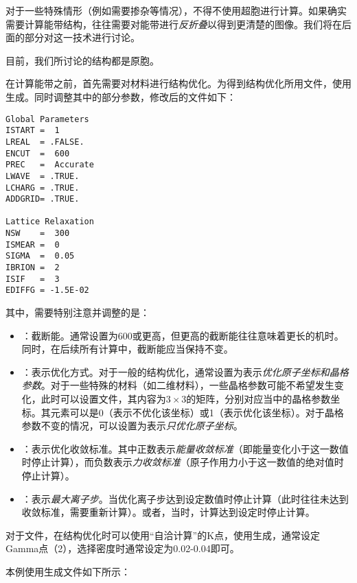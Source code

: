 \begin{extend}
    对于一些特殊情形（例如需要掺杂等情况），不得不使用超胞进行计算。如果确实需要计算能带结构，往往需要对能带进行\emph{反折叠}以得到更清楚的图像。我们将在后面的部分对这一技术进行讨论。

    目前，我们所讨论的结构都是原胞。
\end{extend}

在计算能带之前，首先需要对材料进行结构优化。为得到结构优化所用文件，使用生成。同时调整其中的部分参数，修改后的文件如下：

\begin{lstlisting}[caption=INCAR]
Global Parameters
ISTART =  1
LREAL  = .FALSE.
ENCUT  =  600
PREC   =  Accurate
LWAVE  = .TRUE.
LCHARG = .TRUE.
ADDGRID= .TRUE.
    
Lattice Relaxation
NSW    =  300
ISMEAR =  0
SIGMA  =  0.05
IBRION =  2
ISIF   =  3
EDIFFG = -1.5E-02
\end{lstlisting}

其中，需要特别注意并调整的是：

\begin{itemize}
    \item {}：截断能。通常设置为600或更高，但更高的截断能往往意味着更长的机时。同时，在后续所有计算中，截断能应当保持不变。
    \item {}：表示优化方式。对于一般的结构优化，通常设置为表示\emph{优化原子坐标和晶格参数}。对于一些特殊的材料（如二维材料），一些晶格参数可能不希望发生变化，此时可以设置文件，其内容为$3\times3$的矩阵，分别对应当中的晶格参数坐标。其元素可以是0（表示不优化该坐标）或1（表示优化该坐标）。对于晶格参数不变的情况，可以设置为表示\emph{只优化原子坐标}。
    \item {}：表示优化收敛标准。其中正数表示\emph{能量收敛标准}（即能量变化小于这一数值时停止计算），而负数表示\emph{力收敛标准}（原子作用力小于这一数值的绝对值时停止计算）。
    \item {}：表示\emph{最大离子步}。当优化离子步达到设定数值时停止计算（此时往往未达到收敛标准，需要重新计算）。或者，当时，计算达到设定时停止计算。
\end{itemize}

对于文件，在结构优化时可以使用“自洽计算”的K点，使用生成，通常设定Gamma点（2），选择密度时通常设定为0.02-0.04即可。

本例使用生成文件如下所示：

